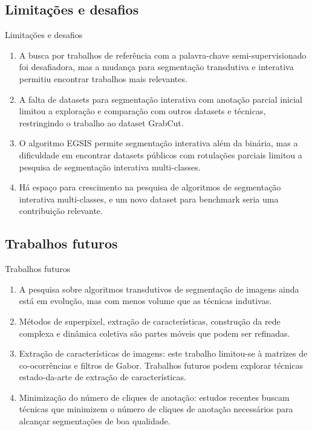 \documentclass{templatebeamerufc/libs/ufc_format}
\begin{document}
\subsection{Limitações e desafios}


\begin{frame}{Limitações e desafios}
  \begin{enumerate}[<+->]
  \item A busca por trabalhos de referência com a palavra-chave
    semi-supervisionado foi desafiadora, mas a mudança para
    segmentação transdutiva e interativa permitiu encontrar trabalhos
    mais relevantes.

  \item A falta de datasets para segmentação interativa com anotação
    parcial inicial limitou a exploração e comparação com outros
    datasets e técnicas, restringindo o trabalho ao dataset GrabCut.

  \item O algoritmo EGSIS permite segmentação interativa além da
    binária, mas a dificuldade em encontrar datasets públicos com rotulações
    parciais limitou a pesquisa de segmentação interativa multi-classes.

  \item Há espaço para crescimento na pesquisa de algoritmos de
    segmentação interativa multi-classes, e um novo dataset para
    benchmark seria uma contribuição relevante.

  \end{enumerate}
\end{frame}




\subsection{Trabalhos futuros}

\begin{frame}{Trabalhos futuros}
  \begin{enumerate}[<+->]
  \item A pesquisa sobre algoritmos transdutivos de segmentação de
imagens ainda está em evolução, mas com menos volume que as técnicas
indutivas.

  \item Métodos de superpixel, extração de características, construção
da rede complexa e dinâmica coletiva são partes móveis que podem ser
refinadas.

  \item Extração de características de imagens: este trabalho
limitou-se à matrizes de co-ocorrências e filtros de Gabor. Trabalhos
futuros podem explorar técnicas estado-da-arte de extração de
características.

  \item Minimização do número de cliques de anotação: estudos recentes
buscam técnicas que minimizem o número de cliques de anotação
necessários para alcançar segmentações de boa qualidade.


  \end{enumerate}
\end{frame}
\end{document}
